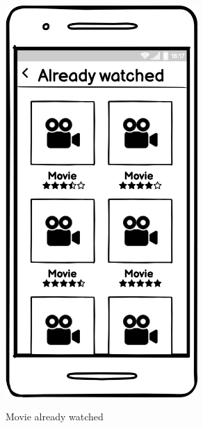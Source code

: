 \documentclass[12pt, a4paper]{article}
\numberwithin{figure}{section}
\begin{document}
\begin{center}
\begin{minipage}{0.33\textwidth}
\begin{figure}[H]
			\includegraphics[width=0.65\textwidth]{images/mockups/Already watched.png}\\
			\caption{Movie already watched}
		\end{figure}
	\end{minipage}
	\hspace{0.01\linewidth}
	\begin{minipage}{0.31\textwidth}
		\begin{figure}[H]
			\centering

\end{figure}
\end{minipage}
\end{center}
\end{document}
